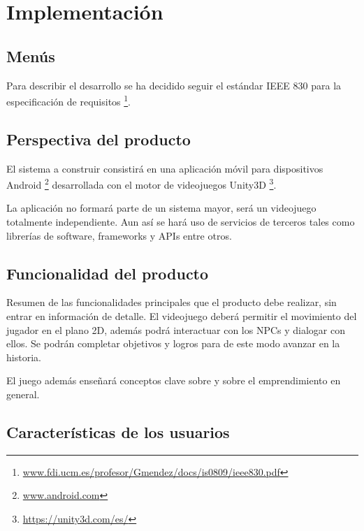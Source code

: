 \chapter{Implementación}

\section{Menús}













Para describir el desarrollo se ha decidido seguir el estándar IEEE 830 para la especificación de requisitos \footnote{\url{www.fdi.ucm.es/profesor/Gmendez/docs/is0809/ieee830.pdf}}.

\section{Perspectiva del producto}

El sistema a construir consistirá en una aplicación móvil para dispositivos Android \footnote{\url{www.android.com}} desarrollada con el motor de videojuegos Unity3D \footnote{\url{https://unity3d.com/es/}}. 

La aplicación no formará parte de un sistema mayor, será un videojuego totalmente independiente. Aun así se hará uso de servicios de terceros tales como librerías de software, frameworks y APIs entre otros.

\section{Funcionalidad del producto}

Resumen de las funcionalidades principales que el producto debe realizar, sin entrar en información de detalle.
El videojuego deberá permitir el movimiento del jugador en el plano 2D, además podrá interactuar con los NPCs y dialogar con ellos. Se podrán completar objetivos y logros para de este modo avanzar en la historia.

El juego además enseñará conceptos clave sobre  y sobre el emprendimiento en general.

\section{Características de los usuarios}


